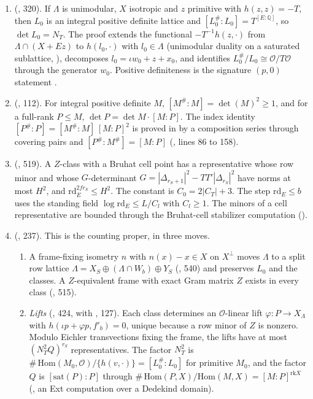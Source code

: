 \documentclass[11pt]{article}
\newcommand{\Ok}{\mathcal O}
\newcommand{\rd}{\mathrm{rd}}
\begin{document}
\begin{enumerate}[leftmargin=*]
\item {} (, 320). If $\Lambda$ is unimodular, $X$ isotropic and $z$ primitive with $h(z,z)=-T$, then $L_0$ is an integral positive definite lattice and $[L_0^\#:L_0]=T^{[E:\mathbb Q]}$, so $\det L_0=N_T$. The proof extends the functional $-T^{-1}h(z,\cdot)$ from $\Lambda\cap(X+Ez)$ to $h(l_0,\cdot)$ with $l_0\in\Lambda$ (unimodular duality on a saturated sublattice, ), decomposes $l_0=\iota w_0+z+x_0$, and identifies $L_0^\#/L_0\cong\Ok/T\Ok$ through the generator $w_0$. Positive definiteness is the signature $(p,0)$ statement .
\item {} (, 112). For integral positive definite $M$, $[M^\#:M]=\det(M)^2\ge1$, and for a full-rank $P\le M$, $\det P=\det M\cdot[M:P]$. The index identity $[P^\#:P]=[M^\#:M]\,[M:P]^2$ is proved in  by a composition series through covering pairs and $[P^\#:M^\#]=[M:P]$ (, lines 86 to 158).
\item {} (, 519). A $Z$-class with a Bruhat cell point has a representative whose row minor and whose $G$-determinant $G=|\Delta_{r_S+1}|^2-TT'|\Delta_{r_S}|^2$ have norms at most $H^2$, and $\rd_E^{2fr_S}\le H^2$. The constant is $C_0=2|C_T|+3$. The step $\rd_E\le b$ uses the standing field $\log\rd_E\le L/C_l$ with $C_l\ge1$. The minors of a cell representative are bounded through the Bruhat-cell stabilizer computation  ().
\item {} (, 237). This is the counting proper, in three moves.
 \begin{enumerate}
 \item A frame-fixing isometry $n$ with $n(x)-x\in X$ on $X^\perp$ moves $\Lambda$ to a split row lattice $\Lambda=X_S\oplus(\Lambda\cap W_b)\oplus Y_S$ (, 540) and preserves $L_0$ and the classes. A $Z$-equivalent frame with exact Gram matrix $Z$ exists in every class (, 515).
 \item \emph{Lifts} (, 424, with , 127). Each class determines an $\Ok$-linear lift $\varphi\colon P\to X_\Lambda$ with $h(\iota p+\varphi p,f'_b)=0$, unique because a row minor of $Z$ is nonzero. Modulo Eichler transvections fixing the frame, the lifts have at most $(N_T^2Q)^{r_S}$ representatives. The factor $N_T^2$ is $\#\,\mathrm{Hom}(M_0,\Ok)/\{h(v,\cdot)\}=[L_0^\#:L_0]$ for primitive $M_0$, and the factor $Q$ is $[\mathrm{sat}(P):P]$ through $\#\,\mathrm{Hom}(P,X)/\mathrm{Hom}(M,X)=[M:P]^{\mathrm{rk}X}$ (, an Ext computation over a Dedekind domain).

\end{enumerate}
\end{enumerate}
\end{document}
